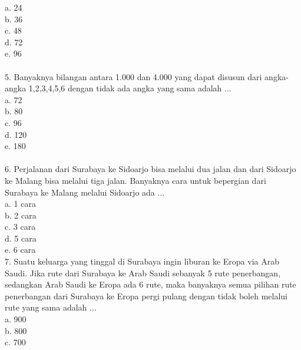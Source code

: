 \documentclass[11pt,fleqn]{book} %
\begin{document}
a.	24\\

b.	36\\

c.	48\\

d.	72\\

e.	96\\
\\

5. Banyaknya bilangan antara 1.000 dan 4.000 yang dapat disusun dari angka-angka 1,2,3,4,5,6 dengan tidak ada angka yang sama adalah ...\\

a.	72\\

b.	80\\

c.	96\\

d.	120\\

e.	180\\
\\

6. Perjalanan dari Surabaya ke Sidoarjo bisa melalui dua jalan dan dari Sidoarjo ke Malang bisa melalui tiga jalan. Banyaknya cara untuk bepergian dari Surabaya ke Malang melalui Sidoarjo ada ...\\

a.	1 cara\\

b.	2 cara\\

c.	3 cara\\

d.	5 cara\\

e.	6 cara\\

7. Suatu keluarga yang tinggal di Surabaya ingin liburan ke Eropa via Arab Saudi. Jika rute dari Surabaya ke Arab Saudi sebanyak 5 rute penerbangan, sedangkan Arab Saudi ke Eropa ada 6 rute, maka banyaknya semua pilihan rute penerbangan dari Surabaya ke Eropa pergi pulang dengan tidak boleh melalui rute yang sama adalah ...\\

a.	900\\

b.	800\\

c.	700\\
\end{document}
